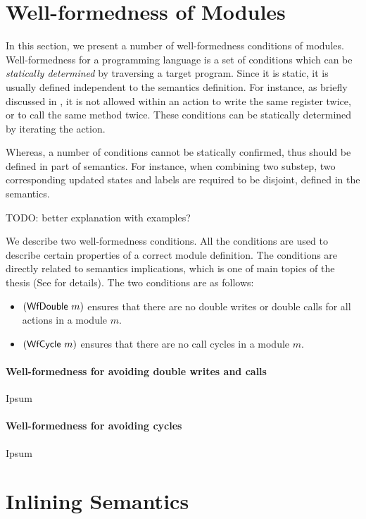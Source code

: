 \section{Well-formedness of Modules}
\label{sec-wf}

In this section, we present a number of well-formedness conditions of
modules. Well-formedness for a programming language is a set of
conditions which can be \emph{statically determined} by traversing a
target program. Since it is static, it is usually defined independent
to the semantics definition. For instance, as briefly discussed in
, it is not allowed within an action to write the
same register twice, or to call the same method twice. These
conditions can be statically determined by iterating the action.

Whereas, a number of conditions cannot be statically confirmed, thus
should be defined in part of semantics. For instance, when combining
two substep, two corresponding updated states and labels are required
to be disjoint, defined in the \Substeps{} semantics.

TODO: better explanation with examples?

We describe two well-formedness conditions. All the conditions are
used to describe certain properties of a correct module
definition. The conditions are directly related to semantics
implications, which is one of main topics of the thesis (See
 for details). The two conditions are as follows:
\begin{itemize}
  \item $(\textsf{WfDouble}\ m)$ ensures that there are no double writes or
    double calls for all actions in a module $m$.
  \item $(\textsf{WfCycle}\ m)$ ensures that there are no call cycles in a
    module $m$.
\end{itemize}

\paragraph{Well-formedness for avoiding double writes and calls}

Ipsum

\paragraph{Well-formedness for avoiding cycles}

Ipsum

\section{Inlining Semantics}

